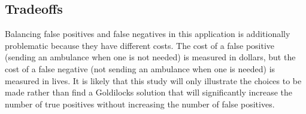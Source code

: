 \subsection{Tradeoffs}

Balancing false positives and false negatives in this application is additionally problematic because they have different costs.  The cost of a false positive (sending an ambulance when one is not needed) is measured in dollars, but the cost of a false negative (not sending an ambulance when one is needed) is measured in lives.  It is likely that this study will only illustrate the choices to be made rather than find a Goldilocks solution that will significantly increase the number of true positives without increasing the number of false positives.  


